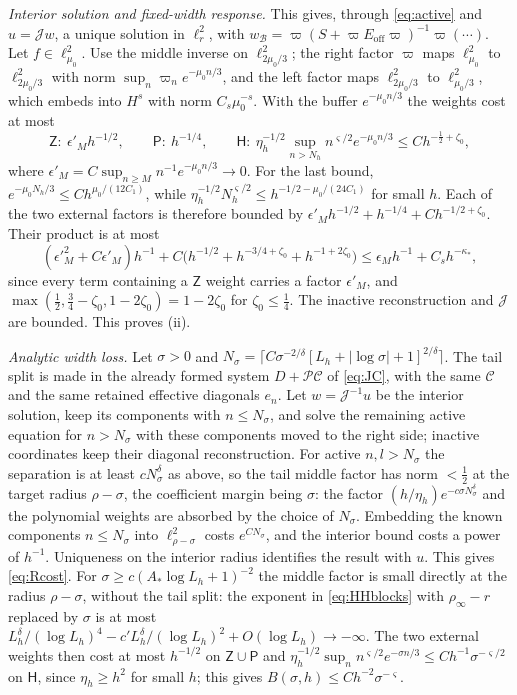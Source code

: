 \documentclass[11pt]{amsart}
\numberwithin{equation}{section}
\theoremstyle{definition}
\theoremstyle{remark}
\newcommand{\abs}[1]{\lvert #1\rvert}
\newcommand{\cP}{\mathcal P}
\newcommand{\cJ}{\mathcal J}
\newcommand{\cC}{\mathcal C}
\begin{document}
\emph{Interior solution and fixed-width response.} This gives, through \eqref{eq:active} and $u=\cJ w$, a unique solution in $\ell^2_r$, with $w_{\mathcal B}=\varpi(S+\varpi E_{\mathrm{off}}\varpi)^{-1}\varpi(\cdots)$. Let $f\in\ell^2_{\mu_0}$. Use the middle inverse on $\ell^2_{2\mu_0/3}$; the right factor $\varpi$ maps $\ell^2_{\mu_0}$ to $\ell^2_{2\mu_0/3}$ with norm $\sup_n\varpi_ne^{-\mu_0n/3}$, and the left factor maps $\ell^2_{2\mu_0/3}$ to $\ell^2_{\mu_0/3}$, which embeds into $H^s$ with norm $C_s\mu_0^{-s}$. With the buffer $e^{-\mu_0n/3}$ the weights cost at most
\[
\mathsf Z:\ \epsilon'_Mh^{-1/2},\qquad\mathsf P:\ h^{-1/4},\qquad\mathsf H:\ \eta_h^{-1/2}\sup_{n>N_h}n^{\varsigma/2}e^{-\mu_0n/3}\le Ch^{-\frac12+\zeta_0},
\]
where $\epsilon'_M=C\sup_{n\ge M}n^{-1}e^{-\mu_0n/3}\to0$. For the last bound, $e^{-\mu_0N_h/3}\le Ch^{\mu_0/(12C_1)}$, while $\eta_h^{-1/2}N_h^{\varsigma/2}\le h^{-1/2-\mu_0/(24C_1)}$ for small $h$. Each of the two external factors is therefore bounded by $\epsilon'_Mh^{-1/2}+h^{-1/4}+Ch^{-1/2+\zeta_0}$. Their product is at most
\[
(\epsilon'^2_M+C\epsilon'_M)h^{-1}+C\bigl(h^{-1/2}+h^{-3/4+\zeta_0}+h^{-1+2\zeta_0}\bigr)\le\epsilon_Mh^{-1}+C_sh^{-\kappa_*},
\]
since every term containing a $\mathsf Z$ weight carries a factor $\epsilon'_M$, and $\max(\frac12,\frac34-\zeta_0,1-2\zeta_0)=1-2\zeta_0$ for $\zeta_0\le\frac14$. The inactive reconstruction and $\cJ$ are bounded. This proves (ii).

\emph{Analytic width loss.} Let $\sigma>0$ and $N_\sigma=\lceil C\sigma^{-2/\delta}[L_h+\abs{\log\sigma}+1]^{2/\delta}\rceil$. The tail split is made in the already formed system $D+\cP\cC$ of \eqref{eq:JC}, with the same $\cC$ and the same retained effective diagonals $e_n$. Let $w=\cJ^{-1}u$ be the interior solution, keep its components with $n\le N_\sigma$, and solve the remaining active equation for $n>N_\sigma$ with these components moved to the right side; inactive coordinates keep their diagonal reconstruction. For active $n,l>N_\sigma$ the separation is at least $cN_\sigma^\delta$ as above, so the tail middle factor has norm $<\frac12$ at the target radius $\rho-\sigma$, the coefficient margin being $\sigma$: the factor $(h/\eta_h)e^{-c\sigma N_\sigma^\delta}$ and the polynomial weights are absorbed by the choice of $N_\sigma$. Embedding the known components $n\le N_\sigma$ into $\ell^2_{\rho-\sigma}$ costs $e^{CN_\sigma}$, and the interior bound costs a power of $h^{-1}$. Uniqueness on the interior radius identifies the result with $u$. This gives \eqref{eq:Rcost}. For $\sigma\ge c(A_*\log L_h+1)^{-2}$ the middle factor is small directly at the radius $\rho-\sigma$, without the tail split: the exponent in \eqref{eq:HHblocks} with $\rho_\infty-r$ replaced by $\sigma$ is at most $L_h^\delta/(\log L_h)^4-c'L_h^\delta/(\log L_h)^2+O(\log L_h)\to-\infty$. The two external weights then cost at most $h^{-1/2}$ on $\mathsf Z\cup\mathsf P$ and $\eta_h^{-1/2}\sup_nn^{\varsigma/2}e^{-\sigma n/3}\le Ch^{-1}\sigma^{-\varsigma/2}$ on $\mathsf H$, since $\eta_h\ge h^2$ for small $h$; this gives $B(\sigma,h)\le Ch^{-2}\sigma^{-\varsigma}$.
\end{document}

